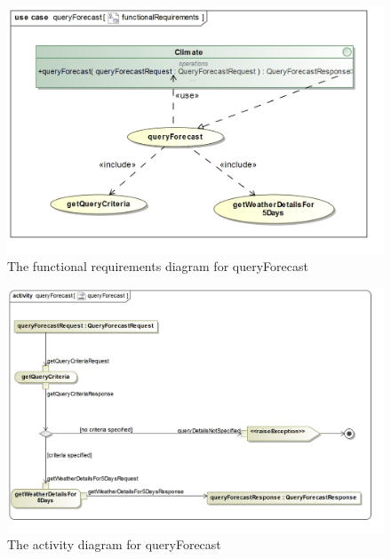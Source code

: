 \begin{figure}[H]
	\centering
	\includegraphics[width=1.0\textwidth]{../images/funcReq/queryForecastFunctionalRequirements.jpg}
	\caption{The functional requirements diagram for queryForecast \label{overflow}}
\end{figure}

\begin{figure}[H]
	\centering
	\includegraphics[scale=0.22]{../images/funcReq/queryForecastActivityDiagram.jpg}
	\caption{The activity diagram for queryForecast \label{overflow}}
\end{figure}